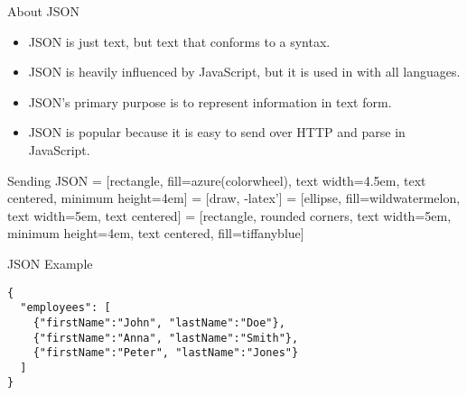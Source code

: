 \begin{frame}{About JSON}
  \begin{itemize}
    \item JSON is just text, but text that conforms to a syntax.
    \item JSON is heavily influenced by JavaScript, but it is used in with all languages.
    \item JSON's primary purpose is to represent information in text form.
    \item JSON is popular because it is easy to send over HTTP and parse in JavaScript.
  \end{itemize}
\end{frame}

\begin{frame}{Sending JSON}
   = [rectangle, fill=azure(colorwheel), text width=4.5em, text centered, minimum height=4em]
   = [draw, -latex']
   = [ellipse, fill=wildwatermelon, text width=5em, text centered]
   = [rectangle, rounded corners, text width=5em, minimum height=4em, text centered, fill=tiffanyblue]
  
  \begin{adjustbox}{max totalsize={.9\textwidth}{.6\textheight},center} 
  \end{adjustbox}
\end{frame}

\begin{frame}[fragile]{JSON Example}
  \begin{verbatim}
{
  "employees": [
    {"firstName":"John", "lastName":"Doe"},
    {"firstName":"Anna", "lastName":"Smith"},
    {"firstName":"Peter", "lastName":"Jones"}
  ]
}
  \end{verbatim}
\end{frame}

